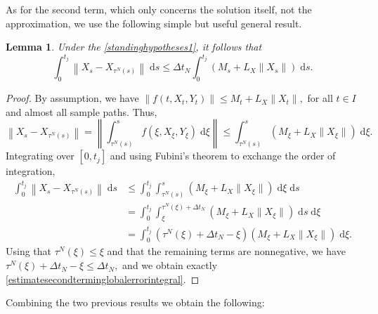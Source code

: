 \documentclass[reqno,12pt]{amsart}
\theoremstyle{plain} %
\newtheorem{lemma}{Lemma}[section]
\theoremstyle{definition} %
\begin{document}
As for the second term, which only concerns the solution itself, not the approximation, we use the following simple but useful general result.

\begin{lemma}
    \label{lemestimatesecondterminglobalerror}
    Under the \cref{standinghypotheses1}, it follows that
    \begin{equation}
        \label{estimatesecondterminglobalerrorintegral}
        \int_0^{t_j}\left\|X_s - X_{\tau^N(s)}\right\| \;\mathrm{d}s \leq \Delta t_N \int_0^{t_j} (M_s + L_X\|X_s\|) \;\mathrm{d}s.
    \end{equation}
\end{lemma}

\begin{proof}
    By assumption, we have $\|f(t, X_t, Y_t)\| \leq M_t + L_X\|X_t\|,$ for all $t\in I$ and almost all sample paths. Thus,
    \[
      \left\|X_s - X_{\tau^N(s)}\right\| = \left\|\int_{\tau^N(s)}^s f(\xi, X_\xi, Y_\xi)\;\mathrm{d}\xi\right\| \leq \int_{\tau^N(s)}^s (M_\xi + L_X\|X_\xi\|)\;\mathrm{d}\xi.
    \]
    Integrating over $[0, t_j]$ and using Fubini's theorem to exchange the order of integration,
    \begin{align*}
        \int_0^{t_j}\left\|X_s - X_{\tau^N(s)}\right\| \;\mathrm{d}s & \leq \int_0^{t_j}\int_{\tau^N(s)}^s (M_\xi + L_X\|X_\xi\|) \;\mathrm{d}\xi \;\mathrm{d}s \\
        & = \int_0^{t_j}\int_\xi^{\tau^N(\xi) + \Delta t_N} (M_\xi + L_X\|X_\xi\|) \;\mathrm{d}s \;\mathrm{d}\xi \\
        & =  \int_0^{t_j} (\tau^N(\xi) + \Delta t_N - \xi) (M_\xi + L_X\|X_\xi\|) \;\mathrm{d}\xi.
    \end{align*}
    Using that $\tau^N(\xi) \leq \xi$ and that the remaining terms are nonnegative, we have $\tau^N(\xi) + \Delta t_N - \xi \leq \Delta t_N,$ and we obtain exactly \eqref{estimatesecondterminglobalerrorintegral}.
\end{proof}

Combining the two previous results we obtain the following:
\end{document}
